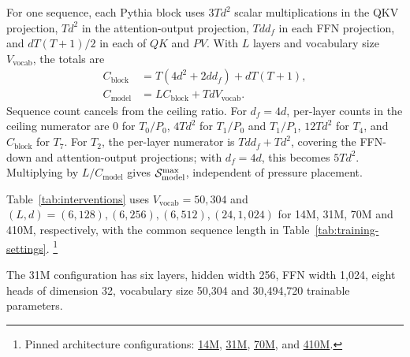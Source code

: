 For one sequence, each Pythia block uses $3Td^2$ scalar multiplications
in the QKV projection, $Td^2$ in the attention-output projection,
$Td d_f$ in each FFN projection, and $dT(T+1)/2$ in each of $QK$ and $PV$.
With $L$ layers and vocabulary size $V_{\mathrm{vocab}}$, the totals are
\begin{equation}
\begin{split}
C_{\mathrm{block}}&=T(4d^2+2dd_f)+dT(T+1),\\
C_{\mathrm{model}}&=LC_{\mathrm{block}}+TdV_{\mathrm{vocab}}.
\end{split}
\label{eq:denominator}
\end{equation}
Sequence count cancels from the ceiling ratio. For $d_f=4d$, per-layer counts
in the ceiling numerator are $0$ for $T_0/P_0$, $4Td^2$ for $T_1/P_0$ and
$T_1/P_1$, $12Td^2$ for $T_4$, and $C_{\mathrm{block}}$ for $T_7$.
For $T_2$, the per-layer numerator is $Tdd_f+Td^2$, covering the FFN-down and attention-output projections; with $d_f=4d$, this becomes $5Td^2$.
Multiplying by $L/C_{\mathrm{model}}$ gives $\mathcal{S}_{\mathrm{model}}^{\max}$, independent of pressure placement.

Table~\ref{tab:interventions} uses $V_{\mathrm{vocab}}=50{,}304$ and
$(L,d)=(6,128),(6,256),(6,512),(24,1{,}024)$ for 14M, 31M, 70M and 410M, respectively,
with the common sequence length in Table~\ref{tab:training-settings}.%
\footnote{Pinned architecture configurations:
\href{https://huggingface.co/EleutherAI/pythia-14m-deduped/blob/7386d9a4ae45aef494a6e704910394def3037fc5/config.json}{14M},
\href{https://huggingface.co/EleutherAI/pythia-31m-deduped/blob/b7782556ba7adfb4730d9bda7d12aa44d88fa132/config.json}{31M},
\href{https://huggingface.co/EleutherAI/pythia-70m-deduped/blob/e93a9faa9c77e5d09219f6c868bfc7a1bd65593c/config.json}{70M}, and
\href{https://huggingface.co/EleutherAI/pythia-410m-deduped/blob/b5e8535141902c0e985cea61fd02afe7fe86af32/config.json}{410M}.}

The 31M configuration has six layers, hidden width 256, FFN width 1,024, eight heads of dimension 32, vocabulary size 50,304 and 30,494,720 trainable parameters.

